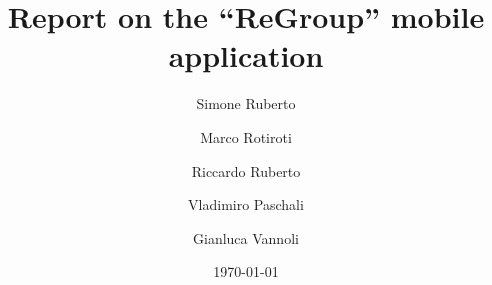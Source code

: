 \documentclass[10pt,a4paper]{article}
\begin{document}
\title{Report on the ``ReGroup'' mobile application}
\author[1]{Simone Ruberto}
\author[1]{Marco Rotiroti}
\author[1]{Riccardo Ruberto}
\author[1]{Vladimiro Paschali}
\author[1]{Gianluca Vannoli}

\date{\today}

\maketitle
\tableofcontents

\newpage








\end{document}
